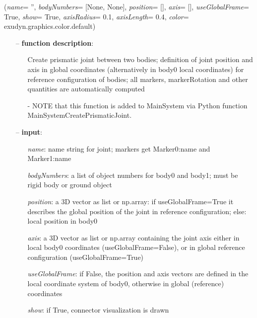 %
\begin{flushleft}
\label{sec:mainsystemextensions:CreatePrismaticJoint}
({\it name}= '', {\it bodyNumbers}= [None, None], {\it position}= [], {\it axis}= [], {\it useGlobalFrame}= True, {\it show}= True, {\it axisRadius}= 0.1, {\it axisLength}= 0.4, {\it color}= exudyn.graphics.color.default)
\end{flushleft}
\setlength{\itemindent}{0.7cm}
\begin{itemize}[leftmargin=0.7cm]
\item[--]
{\bf function description}: \vspace{-6pt}
\begin{itemize}[leftmargin=1.2cm]
\setlength{\itemindent}{-0.7cm}
\item[]Create prismatic joint between two bodies; definition of joint position and axis in global coordinates (alternatively in body0 local coordinates) for reference configuration of bodies; all markers, markerRotation and other quantities are automatically computed
\item[]- NOTE that this function is added to MainSystem via Python function MainSystemCreatePrismaticJoint.
\end{itemize}
\item[--]
{\bf input}: \vspace{-6pt}
\begin{itemize}[leftmargin=1.2cm]
\setlength{\itemindent}{-0.7cm}
\item[]{\it name}: name string for joint; markers get Marker0:name and Marker1:name
\item[]{\it bodyNumbers}: a list of object numbers for body0 and body1; must be rigid body or ground object
\item[]{\it position}: a 3D vector as list or np.array: if useGlobalFrame=True it describes the global position of the joint in reference configuration; else: local position in body0
\item[]{\it axis}: a 3D vector as list or np.array containing the joint axis either in local body0 coordinates (useGlobalFrame=False), or in global reference configuration (useGlobalFrame=True)
\item[]{\it useGlobalFrame}: if False, the position and axis vectors are defined in the local coordinate system of body0, otherwise in global (reference) coordinates
\item[]{\it show}: if True, connector visualization is drawn

\end{itemize}
\end{itemize}
